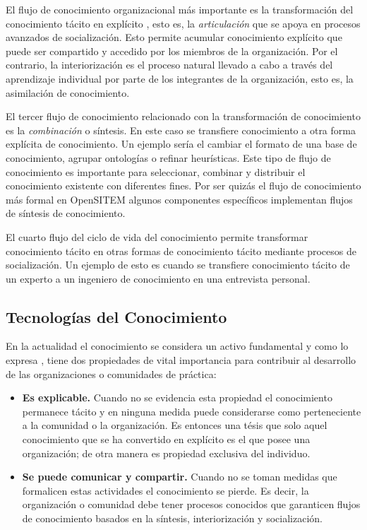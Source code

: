 El flujo de conocimiento organizacional más importante es la transformación del conocimiento tácito en explícito \cite{davies2011}, esto es, la \textit{articulación} que se apoya en procesos avanzados de socialización. Esto permite acumular conocimiento explícito que puede ser compartido y accedido por los miembros de la organización. Por el contrario, la interiorización es el proceso natural llevado a cabo a través del aprendizaje individual por parte de los integrantes de la organización, esto es, la asimilación de conocimiento. 

El tercer flujo de conocimiento relacionado con la transformación de conocimiento es la \textit{combinación} o síntesis. En este caso se transfiere conocimiento a otra forma explícita de conocimiento. Un ejemplo sería el cambiar el formato de una base de conocimiento, agrupar ontologías o refinar heurísticas. Este tipo de flujo de conocimiento es importante para seleccionar, combinar y distribuir el conocimiento existente con diferentes fines. Por ser quizás el flujo de conocimiento más formal en OpenSITEM algunos componentes específicos implementan flujos de síntesis de conocimiento.

El cuarto flujo del ciclo de vida del conocimiento permite transformar conocimiento tácito en otras formas de conocimiento tácito mediante procesos de socialización. Un ejemplo de esto es cuando se transfiere conocimiento tácito de un experto a un ingeniero de conocimiento en una entrevista personal.

\subsection{Tecnologías del Conocimiento}

En la actualidad el conocimiento se considera un activo fundamental y como lo expresa \cite{gang2007}, tiene dos propiedades de vital importancia para contribuir al desarrollo de las organizaciones o comunidades de práctica:

\begin{itemize}
\item \textbf{Es explicable.} Cuando no se evidencia esta propiedad el conocimiento permanece tácito y en ninguna medida puede considerarse como perteneciente a la comunidad o la organización. Es entonces una tésis que solo aquel conocimiento que se ha convertido en explícito es el que posee una organización; de otra manera es propiedad exclusiva del individuo.

\item \textbf{Se puede comunicar y compartir.} Cuando no se toman medidas que formalicen estas actividades el conocimiento se pierde. Es decir, la organización o comunidad debe tener procesos conocidos que garanticen flujos de conocimiento basados en la síntesis, interiorización y socialización.
\end{itemize}

